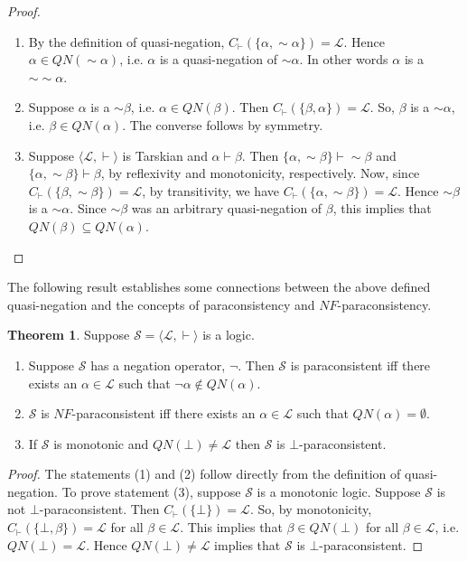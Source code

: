 \documentclass[submission]{eptcs}
\newcommand{\lang}{\mathcal{L}}
\newcommand{\qneg}{\sim\!}
\theoremstyle{definition}
\newtheorem{thm}{Theorem}[section]
\begin{document}
\begin{proof}
\begin{enumerate}[label=(\arabic*)]
    \item By the definition of quasi-negation, $C_\vdash(\{\alpha,\qneg\alpha\})=\lang$. Hence $\alpha\in QN(\qneg\alpha)$, i.e. $\alpha$ is a quasi-negation of $\qneg\alpha$. In other words $\alpha$ is a $\qneg\qneg\alpha$.
    
    \item Suppose $\alpha$ is a $\qneg\beta$, i.e. $\alpha\in QN(\beta)$. Then $C_\vdash(\{\beta,\alpha\})=\lang$. So, $\beta$ is a $\qneg\alpha$, i.e. $\beta\in QN(\alpha)$. The converse follows by symmetry.
    
    \item Suppose $\langle\lang,\vdash\rangle$ is Tarskian and $\alpha\vdash\beta$. Then $\{\alpha,\qneg\beta\}\vdash\qneg\beta$ and $\{\alpha,\qneg\beta\}\vdash\beta$, by reflexivity and monotonicity, respectively. Now, since $C_\vdash(\{\beta,\qneg\beta\})=\lang$, by transitivity, we have $C_\vdash(\{\alpha,\qneg\beta\})=\lang$. Hence $\qneg\beta$ is a $\qneg\alpha$. Since $\qneg\beta$ was an arbitrary quasi-negation of $\beta$, this implies that $QN(\beta)\subseteq QN(\alpha)$.
\end{enumerate}
\end{proof}

The following result establishes some connections between the above defined quasi-negation and the concepts of paraconsistency and $NF$-paraconsistency.

\begin{thm}
Suppose $\mathcal{S}=\langle\lang,\vdash\rangle$ is a logic. 
\begin{enumerate}[label=(\arabic*)]
    \item Suppose $\mathcal{S}$ has a negation operator, $\neg$. Then $\mathcal{S}$ is paraconsistent iff there exists an $\alpha\in\lang$ such that $\neg\alpha\notin QN(\alpha)$.
    \item $\mathcal{S}$ is $NF$-paraconsistent iff there exists an $\alpha\in\lang$ such that $QN(\alpha)=\emptyset$.
    \item If $\mathcal{S}$ is monotonic and $QN(\bot)\neq\lang$ then $\mathcal{S}$ is $\bot$-paraconsistent.
\end{enumerate}
\end{thm}

\begin{proof}
The statements (1) and (2) follow directly from the definition of quasi-negation. To prove statement (3), suppose $\mathcal{S}$ is a monotonic logic. Suppose $\mathcal{S}$ is not $\bot$-paraconsistent. Then $C_\vdash(\{\bot\})=\lang$. So, by monotonicity, $C_\vdash(\{\bot,\beta\})=\lang$ for all $\beta\in\lang$. This implies that $\beta\in QN(\bot)$ for all $\beta\in\lang$, i.e. $QN(\bot)=\lang$. Hence $QN(\bot)\neq\lang$ implies that $\mathcal{S}$ is $\bot$-paraconsistent.
\end{proof}
\end{document}
